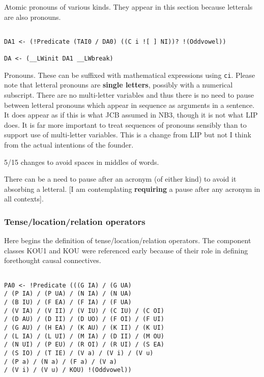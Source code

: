 \documentclass[12pt]{article}
\begin{document}
Atomic pronouns of various kinds.  They appear in this section because letterals are also pronouns.

\begin{verbatim}

DA1 <- (!Predicate (TAI0 / DA0) ((C i ![ ] NI))? !(Oddvowel))

DA <- (__LWinit DA1 __LWbreak)

\end{verbatim}

Pronouns.  These can be suffixed with mathematical expressions using {\tt ci}.  Please note that letteral pronouns are
{\bf single letters}, possibly with a numerical subscript.  There are no multi-letter variables and thus there is no need
to pause between letteral pronouns which appear in sequence as arguments in a sentence.  It does appear as if this is
what JCB assumed in NB3, though it is not what LIP does.  It is far more important to treat sequences of pronouns sensibly
than to support use of multi-letter variables.  This is a change from LIP but not I think from the actual intentions of the founder.

5/15 changes to avoid spaces in middles of words.

There can be a need to pause after an acronym (of either kind) to avoid it absorbing a letteral.   [I am contemplating {\bf requiring} a pause after
any acronym in all contexts].

\subsubsection{Tense/location/relation operators}

Here begins the definition of tense/location/relation operators.  The component classes KOU1 and KOU were referenced
early because of their role in defining forethought causal connectives.

\begin{verbatim}

PA0 <- !Predicate (((G IA) / (G UA) 
/ (P IA) / (P UA) / (N IA) / (N UA) 
/ (B IU) / (F EA) / (F IA) / (F UA) 
/ (V IA) / (V II) / (V IU) / (C IU) / (C OI) 
/ (D AU) / (D II) / (D UO) / (F OI) / (F UI) 
/ (G AU) / (H EA) / (K AU) / (K II) / (K UI) 
/ (L IA) / (L UI) / (M IA) / (D II) / (M OU) 
/ (N UI) / (P EU) / (R OI) / (R UI) / (S EA) 
/ (S IO) / (T IE) / (V a) / (V i) / (V u) 
/ (P a) / (N a) / (F a) / (V a) 
/ (V i) / (V u) / KOU) !(Oddvowel))

\end{verbatim}
\end{document}
